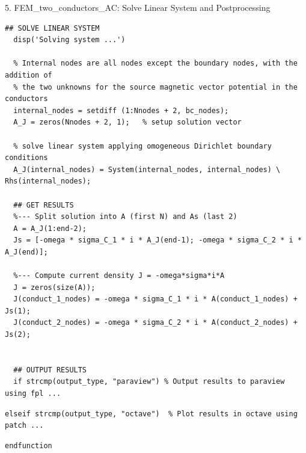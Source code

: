 \documentclass[aspectratio=54,xcolor=dvipsnames]{beamer}
\begin{document}
\begin{frame}[fragile]{5. FEM\_two\_conductors\_AC: Solve Linear System and Postprocessing}
\scriptsize
\begin{lstlisting}[firstnumber=109]
  ## SOLVE LINEAR SYSTEM
  disp('Solving system ...')

  % Internal nodes are all nodes except the boundary nodes, with the addition of
  % the two unknowns for the source magnetic vector potential in the conductors
  internal_nodes = setdiff (1:Nnodes + 2, bc_nodes);
  A_J = zeros(Nnodes + 2, 1);   % setup solution vector

  % solve linear system applying omogeneous Dirichlet boundary conditions
  A_J(internal_nodes) = System(internal_nodes, internal_nodes) \ Rhs(internal_nodes);

  ## GET RESULTS
  %--- Split solution into A (first N) and As (last 2)
  A = A_J(1:end-2);
  Js = [-omega * sigma_C_1 * i * A_J(end-1); -omega * sigma_C_2 * i * A_J(end)];

  %--- Compute current density J = -omega*sigma*i*A
  J = zeros(size(A));
  J(conduct_1_nodes) = -omega * sigma_C_1 * i * A(conduct_1_nodes) + Js(1);
  J(conduct_2_nodes) = -omega * sigma_C_2 * i * A(conduct_2_nodes) + Js(2);
  

  ## OUTPUT RESULTS
  if strcmp(output_type, "paraview") % Output results to paraview using fpl ...

\end{lstlisting}
\begin{lstlisting}[firstnumber=153]
  elseif strcmp(output_type, "octave")  % Plot results in octave using patch ...
\end{lstlisting}
\begin{lstlisting}[firstnumber=180]
endfunction
\end{lstlisting}
\end{frame}
\end{document}
